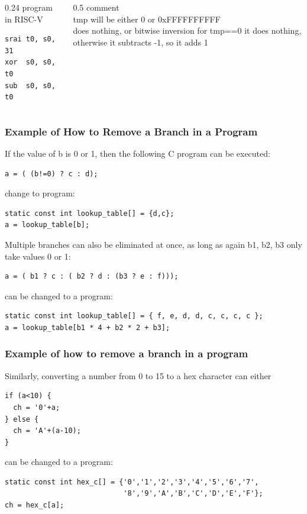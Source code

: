 \documentclass[aspectratio=169]{beamer}
\begin{document}
\begin{frame}[fragile]
\begin{columns}[T]
\begin{column}{0.24\textwidth}
program in RISC-V
\begin{verbatim}
srai t0, s0, 31
xor  s0, s0, t0
sub  s0, s0, t0
\end{verbatim}
\end{column}
\begin{column}{0.5\textwidth}
\phantom{x}comment\\
\small
tmp will be either 0 or 0xFFFFFFFFFF\\
does nothing, or bitwise inversion
for tmp==0 it does nothing, otherwise it subtracts -1, so it adds 1
\end{column}
\end{columns}
\end{frame}

\begin{frame}[fragile]
\frametitle{Example of How to Remove a Branch in a Program}

If the value of b is 0 or 1, then the following C program can be executed:

\begin{verbatim}
a = ( (b!=0) ? c : d);
\end{verbatim}

change to program:

\begin{verbatim}
static const int lookup_table[] = {d,c};
a = lookup_table[b];
\end{verbatim}

\bigskip
Multiple branches can also be eliminated at once, as long as again b1, b2, b3 only take values 0 or 1:

\begin{verbatim}
a = ( b1 ? c : ( b2 ? d : (b3 ? e : f)));
\end{verbatim}

can be changed to a program:

\begin{verbatim}
static const int lookup_table[] = { f, e, d, d, c, c, c, c };
a = lookup_table[b1 * 4 + b2 * 2 + b3];
\end{verbatim}
\end{frame}

\begin{frame}[fragile]
\frametitle{Example of how to remove a branch in a program}

Similarly, converting a number from 0 to 15 to a hex character can either
\begin{verbatim}
if (a<10) {
  ch = '0'+a;
} else {
  ch = 'A'+(a-10);
}
\end{verbatim}

can be changed to a program:

\begin{verbatim}
static const int hex_c[] = {'0','1','2','3','4','5','6','7',
                            '8','9','A','B','C','D','E','F'};
ch = hex_c[a];
\end{verbatim}
\end{frame}
\end{document}
